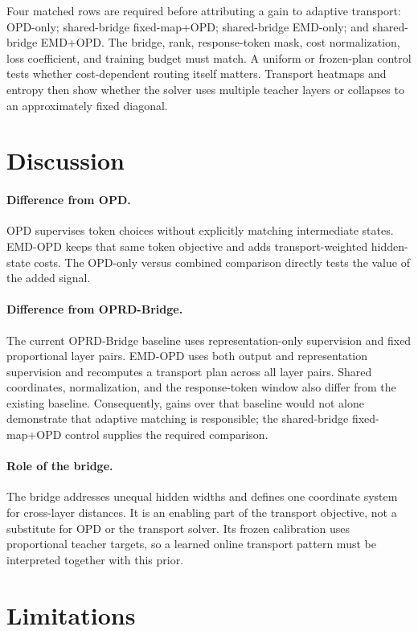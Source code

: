 \documentclass[10pt,twocolumn]{article}
\newcommand{\method}{\textsc{EMD-OPD}}
\begin{document}
Four matched rows are required before attributing a gain to adaptive transport: OPD-only; shared-bridge fixed-map+OPD; shared-bridge EMD-only; and shared-bridge EMD+OPD. The bridge, rank, response-token mask, cost normalization, loss coefficient, and training budget must match. A uniform or frozen-plan control tests whether cost-dependent routing itself matters. Transport heatmaps and entropy then show whether the solver uses multiple teacher layers or collapses to an approximately fixed diagonal.

\section{Discussion}

\paragraph{Difference from OPD.}
OPD supervises token choices without explicitly matching intermediate states. \method{} keeps that same token objective and adds transport-weighted hidden-state costs. The OPD-only versus combined comparison directly tests the value of the added signal.

\paragraph{Difference from OPRD-Bridge.}
The current OPRD-Bridge baseline uses representation-only supervision and fixed proportional layer pairs. \method{} uses both output and representation supervision and recomputes a transport plan across all layer pairs. Shared coordinates, normalization, and the response-token window also differ from the existing baseline. Consequently, gains over that baseline would not alone demonstrate that adaptive matching is responsible; the shared-bridge fixed-map+OPD control supplies the required comparison.

\paragraph{Role of the bridge.}
The bridge addresses unequal hidden widths and defines one coordinate system for cross-layer distances. It is an enabling part of the transport objective, not a substitute for OPD or the transport solver. Its frozen calibration uses proportional teacher targets, so a learned online transport pattern must be interpreted together with this prior.

\section{Limitations}
\end{document}
